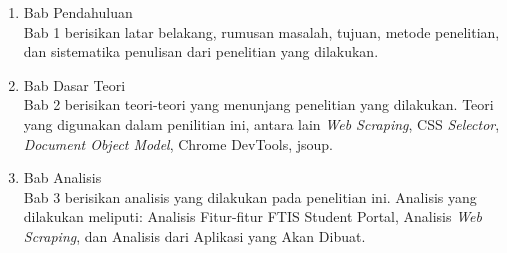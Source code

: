 \begin{enumerate}
  \item Bab Pendahuluan \\
  Bab 1 berisikan latar belakang, rumusan masalah, tujuan, metode penelitian,
  dan sistematika penulisan dari penelitian yang dilakukan.
  \item Bab Dasar Teori \\
  Bab 2 berisikan teori-teori yang menunjang penelitian yang dilakukan. Teori
  yang digunakan dalam penilitian ini, antara lain \textit{Web Scraping}, CSS \textit{Selector},
	\textit{Document Object Model}, Chrome DevTools, jsoup.
  \item Bab Analisis \\
  Bab 3 berisikan analisis yang dilakukan pada penelitian ini. Analisis yang
  dilakukan meliputi: Analisis Fitur-fitur FTIS Student Portal, Analisis \textit{Web Scraping}, 
	dan Analisis dari Aplikasi yang Akan Dibuat.
\end{enumerate}
